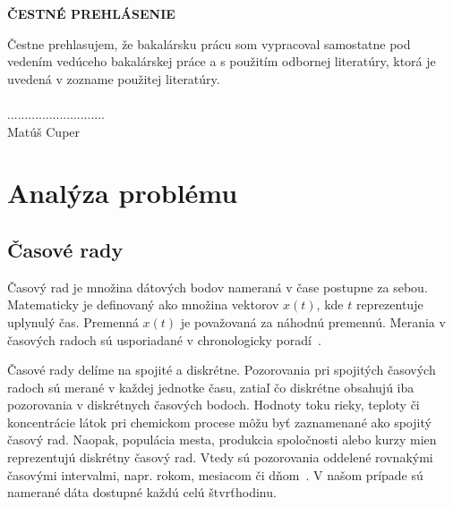 \documentclass[a4paper,slovak,12pt,appendix]{article}
\begin{document}
\newpage
\thispagestyle{plain}
\vspace*{15cm}
\begin{large}
  \noindent \textbf{ČESTNÉ PREHLÁSENIE} \par
\end{large}
\vspace*{0.5cm}
\noindent
Čestne prehlasujem, že bakalársku prácu som vypracoval samostatne pod vedením
vedúceho bakalárskej práce a s použitím odbornej literatúry, ktorá je uvedená
v zozname použitej literatúry. \\
\vspace*{0.5cm}\\
\hspace*{10cm}............................\\
\hspace*{10.7cm} Matúš Cuper


\newpage
\tableofcontents


\newpage
\section{Analýza problému}


\subsection{Časové rady}
Časový rad je množina dátových bodov nameraná v čase postupne za sebou.
Matematicky je definovaný ako množina vektorov $x(t)$, kde $t$ reprezentuje
uplynulý čas. Premenná $x(t)$ je považovaná za náhodnú premennú.
Merania v časových radoch sú usporiadané v chronologicky
poradí~\cite{Agrawal2013}.

Časové rady delíme na spojité a diskrétne. Pozorovania pri spojitých časových
radoch sú merané v každej jednotke času, zatiaľ čo diskrétne obsahujú iba
pozorovania v diskrétnych časových bodoch. Hodnoty toku rieky, teploty
či koncentrácie látok pri chemickom procese môžu byť zaznamenané ako spojitý
časový rad. Naopak, populácia mesta, produkcia spoločnosti alebo kurzy mien
reprezentujú diskrétny časový rad. Vtedy sú pozorovania oddelené rovnakými
časovými intervalmi, napr. rokom, mesiacom či dňom~\cite{Agrawal2013}. V našom
prípade sú namerané dáta dostupné každú celú štvrťhodinu.
\end{document}
